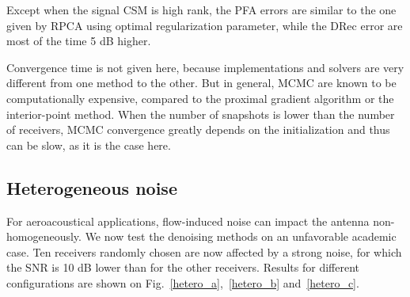 \documentclass[fontsize=12pt,DIV13,paper=a4,abstract=true,titlepage=false]{scrartcl}
\begin{document}
%		
%		
%		 

Except when the signal CSM is high rank, the PFA errors are similar to the one given by RPCA using optimal regularization parameter, while the DRec error are most of the time 5 dB higher.

Convergence time is not given here, because implementations and solvers are very different from one method to the other.  But in general, MCMC are known to be computationally expensive, compared to the proximal gradient algorithm or the interior-point method. When the number of snapshots is lower than the number of receivers, MCMC convergence greatly depends on the initialization and thus can be slow, as it is the case here.
 
\subsection{Heterogeneous noise}
For aeroacoustical applications, flow-induced noise can impact the antenna non-homogeneously. We now test the denoising methods on an unfavorable academic case. Ten receivers randomly chosen are now affected by a strong noise, for which the SNR is 10 dB lower than for the other receivers.  Results for different configurations are shown on Fig.~\ref{hetero_a},~\ref{hetero_b} and~\ref{hetero_c}.
\end{document}
